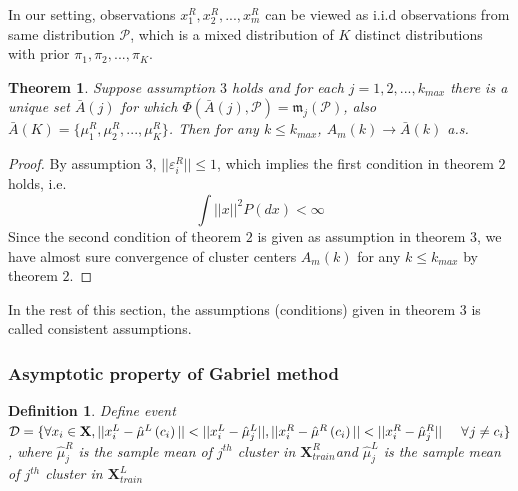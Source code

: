 \documentclass[11pt]{article}
\newtheorem{theorem}{Theorem}
\newtheorem{definition}{Definition}
\begin{document}
In our setting, observations $x^R_1, x^R_2,...,x^R_m$ can be viewed as i.i.d observations from same distribution $\mathcal{P}$, which is a mixed distribution of $K$ distinct distributions with prior $\pi_1,\pi_2,...,\pi_K$.
\begin{theorem}
Suppose assumption $3$ holds and for each $j=1,2,...,k_{max}$ there is a unique set $\bar{A}(j)$ for which $\Phi(\bar{A}(j),\mathcal{P})=\mathfrak{m}_j(\mathcal{P})$, also $ \bar{A}(K) = \{\mu^R_1,\mu^R_2,...,\mu^R_K\}$. Then for any $k \leq k_{max}$, $A_m(k) \to \bar{A}(k)$ a.s.
\end{theorem}
\begin{proof}
By assumption $3$, $||\varepsilon^R_i||\leq 1$, which implies the first condition in theorem $2$ holds, i.e.
\[\int ||x||^2P(dx) < \infty\] 
Since the second condition of theorem $2$ is given as assumption in theorem $3$, we have almost sure convergence of cluster centers $A_m(k)$ for any $k \leq k_{max}$ by theorem $2$. 
\end{proof}
\noindent
In the rest of this section, the assumptions (conditions) given in theorem $3$ is called consistent assumptions. 
\subsubsection{Asymptotic property of Gabriel method}
\begin{definition}
Define event\\ $\mathcal{D} = \{\forall x_i \in \mathbf{X}, ||x^L_i-\hat{\mu}^L \left(c_i\right)|| < ||x^L_i-\hat{\mu}^L_{j}||, ||x^R_i-\hat{\mu}^R \left(c_i\right)|| < ||x^R_i-\hat{\mu}^R_{j}|| \hspace{0.2 in} \forall \hspace{0.01 in}j\neq c_i\}$, where $\hat{\mu}^R_{j}$ is the sample mean of $j^{th}$ cluster in $\mathbf{X}^R_{train}$and $\hat{\mu}^L_{j}$ is the sample mean of $j^{th}$ cluster in $\mathbf{X}^L_{train}$
\end{definition}
\end{document}
